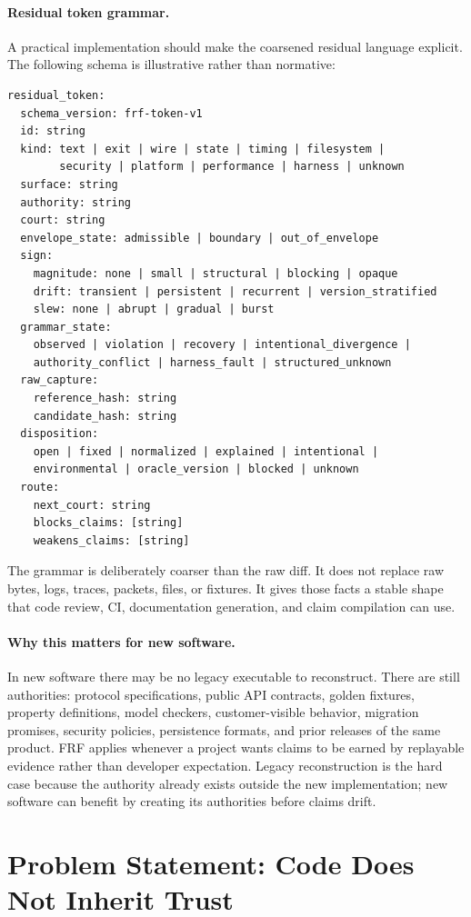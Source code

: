 \documentclass[11pt,a4paper]{article}
\newcommand{\frf}{\textsc{FRF}}
\begin{document}
\paragraph{Residual token grammar.}
A practical implementation should make the coarsened residual language explicit. The following schema is illustrative rather than normative:
\begin{verbatim}
residual_token:
  schema_version: frf-token-v1
  id: string
  kind: text | exit | wire | state | timing | filesystem |
        security | platform | performance | harness | unknown
  surface: string
  authority: string
  court: string
  envelope_state: admissible | boundary | out_of_envelope
  sign:
    magnitude: none | small | structural | blocking | opaque
    drift: transient | persistent | recurrent | version_stratified
    slew: none | abrupt | gradual | burst
  grammar_state:
    observed | violation | recovery | intentional_divergence |
    authority_conflict | harness_fault | structured_unknown
  raw_capture:
    reference_hash: string
    candidate_hash: string
  disposition:
    open | fixed | normalized | explained | intentional |
    environmental | oracle_version | blocked | unknown
  route:
    next_court: string
    blocks_claims: [string]
    weakens_claims: [string]
\end{verbatim}
The grammar is deliberately coarser than the raw diff. It does not replace raw bytes, logs, traces, packets, files, or fixtures. It gives those facts a stable shape that code review, CI, documentation generation, and claim compilation can use.

\paragraph{Why this matters for new software.}
In new software there may be no legacy executable to reconstruct. There are still authorities: protocol specifications, public API contracts, golden fixtures, property definitions, model checkers, customer-visible behavior, migration promises, security policies, persistence formats, and prior releases of the same product. \frf{} applies whenever a project wants claims to be earned by replayable evidence rather than developer expectation. Legacy reconstruction is the hard case because the authority already exists outside the new implementation; new software can benefit by creating its authorities before claims drift.

\section{Problem Statement: Code Does Not Inherit Trust}
\end{document}

